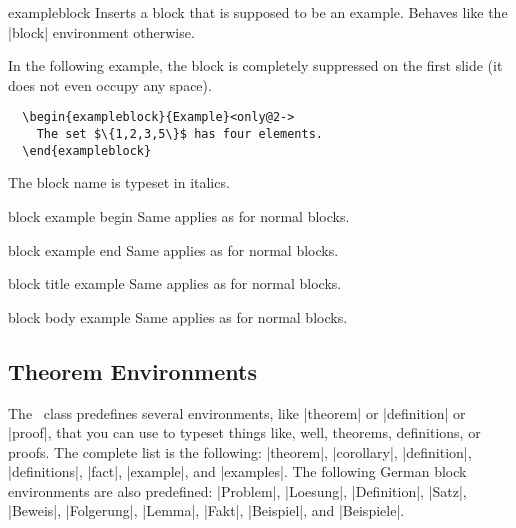 \begin{environment}{{exampleblock}}
  Inserts a block that is supposed to be an example. Behaves like the |block| environment otherwise.

  \example
  In the following example, the block is completely suppressed on the first slide (it does not even occupy any space).
\begin{verbatim}
  \begin{exampleblock}{Example}<only@2->
    The set $\{1,2,3,5\}$ has four elements.
  \end{exampleblock}
\end{verbatim}

  \articlenote
  The block name is typeset in italics.

  \begin{element}{block example begin}\yes\no\no
    Same applies as for normal blocks.
  \end{element}

  \begin{element}{block example end}\yes\no\no
    Same applies as for normal blocks.
  \end{element}

  \begin{element}{block title example}\no\yes\yes
    Same applies as for normal blocks.
  \end{element}

  \begin{element}{block body example}\no\yes\yes
    Same applies as for normal blocks.
  \end{element}
\end{environment}


\subsection{Theorem Environments}
\label{section-theorems}

The \beamer\ class predefines several environments, like |theorem| or |definition| or |proof|, that you can use to typeset things like, well, theorems, definitions, or proofs. The complete list is the following:  |theorem|, |corollary|, |definition|, |definitions|, |fact|, |example|, and |examples|. The following German block environments are also predefined: |Problem|, |Loesung|, |Definition|, |Satz|, |Beweis|, |Folgerung|, |Lemma|, |Fakt|, |Beispiel|, and |Beispiele|.

